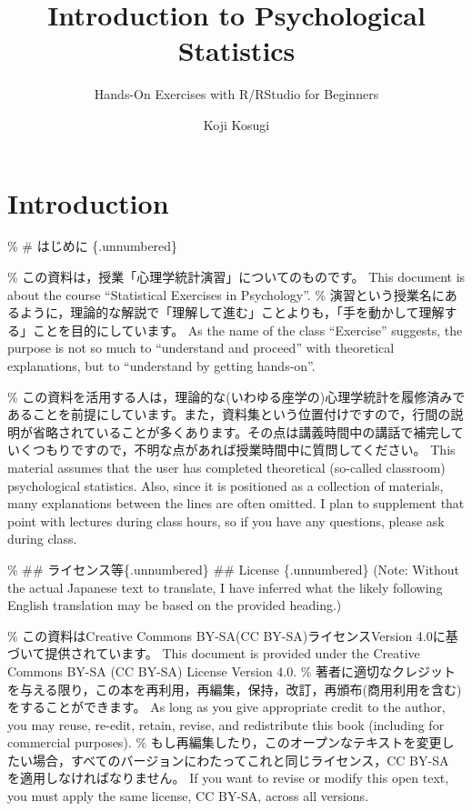 \documentclass[
  a4paper,
]{book}
\title{Introduction to Psychological Statistics}
\subtitle{Hands-On Exercises with R/RStudio for Beginners}
\author{Koji Kosugi}
\date{}
\renewcommand*\contentsname{Table of contents}
\newcommand\contentsname{Table of contents}
\begin{document}
\frontmatter
\maketitle

\renewcommand*\contentsname{Table of contents}
{
\hypersetup{linkcolor=}
\setcounter{tocdepth}{2}
\tableofcontents
}
\mainmatter
{}

\chapter*{Introduction}\label{introduction}


\% \# はじめに \{.unnumbered\}

\% この資料は，授業「心理学統計演習」についてのものです。 This document
is about the course ``Statistical Exercises in Psychology''. \%
演習という授業名にあるように，理論的な解説で「理解して進む」ことよりも，「手を動かして理解する」ことを目的にしています。
As the name of the class ``Exercise'' suggests, the purpose is not so
much to ``understand and proceed'' with theoretical explanations, but to
``understand by getting hands-on''.

\%
この資料を活用する人は，理論的な(いわゆる座学の)心理学統計を履修済みであることを前提にしています。また，資料集という位置付けですので，行間の説明が省略されていることが多くあります。その点は講義時間中の講話で補完していくつもりですので，不明な点があれば授業時間中に質問してください。
This material assumes that the user has completed theoretical (so-called
classroom) psychological statistics. Also, since it is positioned as a
collection of materials, many explanations between the lines are often
omitted. I plan to supplement that point with lectures during class
hours, so if you have any questions, please ask during class.

\% \#\# ライセンス等\{.unnumbered\} \#\# License \{.unnumbered\} (Note:
Without the actual Japanese text to translate, I have inferred what the
likely following English translation may be based on the provided
heading.)

\% この資料はCreative Commons BY-SA(CC BY-SA)ライセンスVersion
4.0に基づいて提供されています。 This document is provided under the
Creative Commons BY-SA (CC BY-SA) License Version 4.0. \%
著者に適切なクレジットを与える限り，この本を再利用，再編集，保持，改訂，再頒布(商用利用を含む)をすることができます。
As long as you give appropriate credit to the author, you may reuse,
re-edit, retain, revise, and redistribute this book (including for
commercial purposes). \%
もし再編集したり，このオープンなテキストを変更したい場合，すべてのバージョンにわたってこれと同じライセンス，CC
BY-SA を適用しなければなりません。 If you want to revise or modify this
open text, you must apply the same license, CC BY-SA, across all
versions.
\end{document}
